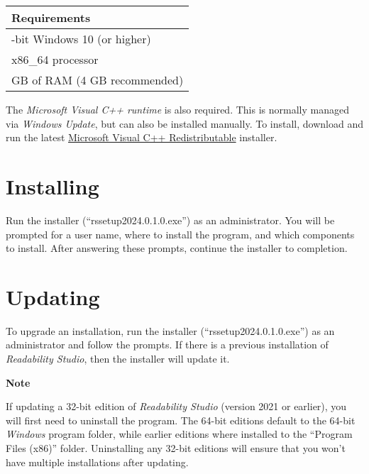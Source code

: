 \documentclass[
  letterpaper,
]{LegrandOrangeBook}
\newenvironment{notesection}
    {
    \begin{tcolorbox}[colframe=mediumblue,colback=lightblue,coltext=mediumblue,arc=3mm]
    \faEdit[regular] \textbf{Note} \newline
    }
    {
    \end{tcolorbox}
    }
\begin{document}
\begin{longtable}[]{@{}
  >{\raggedright\arraybackslash}p{}@{}}
\toprule\noalign{}
\begin{minipage}[b]{\linewidth}\raggedright
Requirements
\end{minipage} \\
\midrule\noalign{}
\endhead
\bottomrule\noalign{}
\endlastfoot
64-bit Windows 10 (or higher) \\
x86\_64 processor \\
2 GB of RAM (4 GB recommended) \\
\end{longtable}

The \emph{Microsoft Visual C++ runtime} is also required. This is
normally managed via \emph{Windows Update}, but can also be installed
manually. To install, download and run the latest
\href{https://learn.microsoft.com/en-us/cpp/windows/latest-supported-vc-redist}{Microsoft
Visual C++ Redistributable} installer.

\section*{Installing}\label{installing-1}


Run the installer (``rssetup2024.0.1.0.exe'') as an administrator. You
will be prompted for a user name, where to install the program, and
which components to install. After answering these prompts, continue the
installer to completion.

\section*{Updating}\label{updating}


To upgrade an installation, run the installer
(``rssetup2024.0.1.0.exe'') as an administrator and follow the prompts.
If there is a previous installation of \emph{Readability Studio}, then
the installer will update it.

\begin{notesection}
If updating a 32-bit edition of \emph{Readability Studio} (version 2021
or earlier), you will first need to uninstall the program. The 64-bit
editions default to the 64-bit \emph{Windows} program folder, while
earlier editions where installed to the ``Program Files (x86)'' folder.
Uninstalling any 32-bit editions will ensure that you won't have
multiple installations after updating.

\end{notesection}
\end{document}
